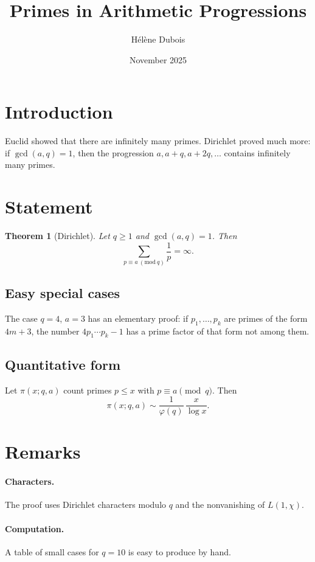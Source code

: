 \documentclass[12pt,letterpaper]{article}
\newtheorem{theorem}{Theorem}
\begin{document}
\title{Primes in Arithmetic Progressions}
\author{Hélène Dubois}
\date{November 2025}
\maketitle
\tableofcontents

\section{Introduction}
Euclid showed that there are infinitely many primes. Dirichlet proved much more: if $\gcd(a,q)=1$, then the progression $a, a+q, a+2q,\dots$ contains infinitely many primes.

\section{Statement}
\begin{theorem}[Dirichlet]\label{thm:dir}
Let $q\ge1$ and $\gcd(a,q)=1$. Then
\[
\sum_{p\equiv a\ (\mathrm{mod}\ q)}\frac1p=\infty.
\]
\end{theorem}

\subsection{Easy special cases}
The case $q=4$, $a=3$ has an elementary proof: if $p_1,\dots,p_k$ are primes of the form $4m+3$, the number $4p_1\cdots p_k-1$ has a prime factor of that form not among them.

\subsection{Quantitative form}
Let $\pi(x;q,a)$ count primes $p\le x$ with $p\equiv a\pmod q$. Then
\begin{equation}
\pi(x;q,a)\sim\frac{1}{\varphi(q)}\,\frac{x}{\log x}.
\end{equation}

\section{Remarks}
\paragraph{Characters.} The proof uses Dirichlet characters modulo $q$ and the nonvanishing of $L(1,\chi)$.
\paragraph{Computation.} A table of small cases for $q=10$ is easy to produce by hand.
\end{document}
